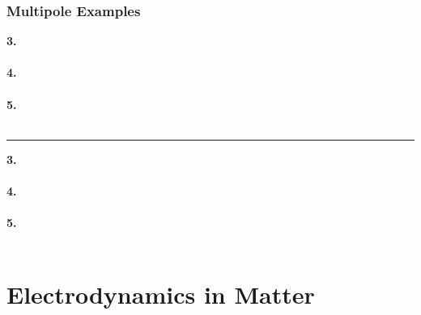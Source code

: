 \documentclass[12pt]{article}
\begin{document}
\subsubsection{Multipole Examples}
\hfill \break
\begin{minipage}[t]{0.5\textwidth}
	\textbf{3. \ \ \ }\\ \\
	
	\hfill \break
	\textbf{4. \ \ \ }\\ \\

	\hfill \break
	\textbf{5. \ \ \ }\\ \\

\end{minipage}
\hspace{0.02\textwidth}
\rule[-388pt]{.5pt}{400pt}
\hspace{0.02\textwidth}
\begin{minipage}[t]{0.4\textwidth}
	\textbf{3. \ \ \ }\\ \\
	
	\hfill \break
	\textbf{4. \ \ \ }\\ \\

	\hfill \break
	\textbf{5. \ \ \ }\\ \\

\end{minipage}

\newpage
\section{Electrodynamics in Matter}
\end{document}
